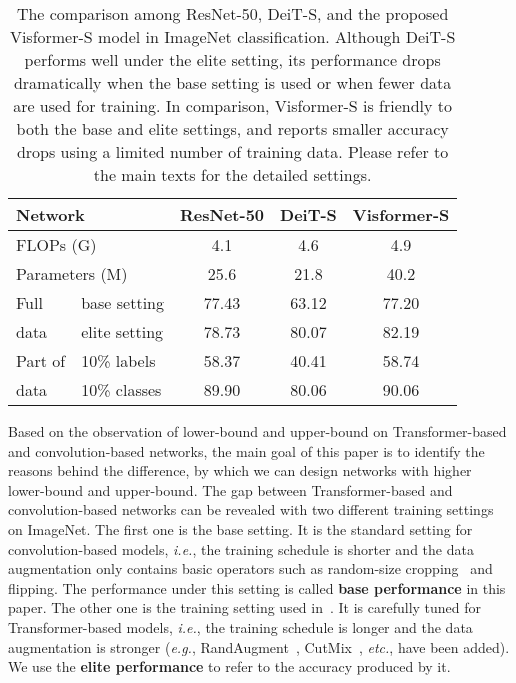 \documentclass[10pt,twocolumn,letterpaper]{article}
\begin{document}
\begin{table}
\begin{center}
\setlength{\tabcolsep}{0.12cm}
\begin{tabular}{|l|l|c|c|c|}
\hline
\multicolumn{2}{|l|}{Network} & ResNet-50 & DeiT-S & Visformer-S \\
\hline\hline
\multicolumn{2}{|l|}{FLOPs (G)} & 4.1 & 4.6 & 4.9 \\
\hline
\multicolumn{2}{|l|}{Parameters (M)} & 25.6 & 21.8 & 40.2 \\
\hline\hline
Full & base setting  & 77.43 & 63.12 & 77.20 \\
\cline{2-5}
data & elite setting & 78.73 & 80.07 & 82.19 \\
\hline
Part of & 10\% labels & 58.37 &40.41 & 58.74 \\
\cline{2-5}
data & 10\% classes  & 89.90  &80.06  &  90.06 \\
\hline
\end{tabular}
\end{center}
\caption{The comparison among ResNet-50, DeiT-S, and the proposed Visformer-S model in ImageNet classification. Although DeiT-S performs well under the elite setting, its performance drops dramatically when the base setting is used or when fewer data are used for training. In comparison, Visformer-S is friendly to both the base and elite settings, and reports smaller accuracy drops using a limited number of training data. Please refer to the main texts for the detailed settings.}
\label{tab:introduction}
\end{table}

Based on the observation of lower-bound and upper-bound on Transformer-based and convolution-based networks, the main goal of this paper is to identify the reasons behind the difference, by which we can design networks with higher lower-bound and upper-bound. The gap between Transformer-based and convolution-based networks can be revealed with two different training settings on ImageNet. The first one is the base setting. It is the standard setting for convolution-based models, \textit{i.e.}, the training schedule is shorter and the data augmentation only contains basic operators such as random-size cropping~\cite{szegedy2016rethinking} and flipping. The performance under this setting is called \textbf{base performance} in this paper. The other one is the training setting used in~\cite{touvron2020training}. It is carefully tuned for Transformer-based models, \textit{i.e.}, the training schedule is longer and the data augmentation is stronger (\textit{e.g.}, RandAugment~\cite{cubuk2020randaugment}, CutMix~\cite{yun2019cutmix}, \textit{etc.}, have been added). We use the \textbf{elite performance} to refer to the accuracy produced by it.
\end{document}
